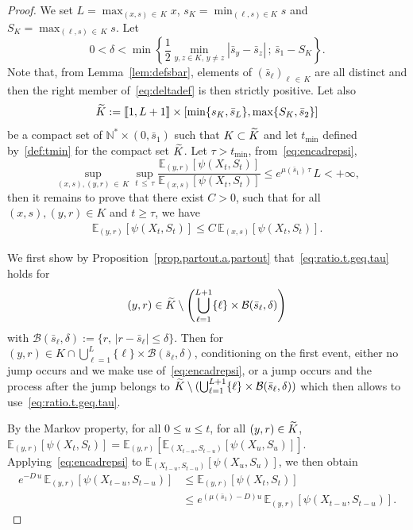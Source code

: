 \documentclass[AHL,Unicode,longabstracts,published]{cedram}
\newcommand{\llbracket}{\mathopen{[\mkern -2.7mu[}}
\newcommand{\rrbracket}{\mathclose{]\mkern -2.7mu]}}
\newcommand{\NN}{\mathbb{N}}
\newcommand{\EE}{\mathbb{E}}
\newcommand{\clB}{\mathcal{B}}
\newcommand{\SminK}{s_K}
\newcommand{\SmaxK}{S_K}
\newcommand{\barmu}{\mu(\bar s_1)}
\newcommand{\1}{\mathbf{1}}
\let\oldtilde\tilde
\renewcommand*{\tilde}[1]{\mathchoice{\widetilde{#1}}{\widetilde{#1}}{\oldtilde{#1}}{\oldtilde{#1}}}
\begin{document}
\begin{proof}
We set $L=\max_{(x,s)\,\in\,K}x$, $\SminK=\min_{(\ell, s)\in K} s $ and $\SmaxK=\max_{(\ell, s)\,\in\,K} s $. Let
\begin{equation}\label{eq:deltadef}
0<\delta < \min\left\{\frac{1}{2} \min_{y,z \in K, \, y\neq z } |\bar s_y - \bar s_z|\, ; \, \bar s_1-\SmaxK\right\}.
\end{equation}
Note that, from Lemma~\ref{lem:defsbar}, elements of $(\bar s_\ell)_{\ell \,\in\,K}$ are all distinct and then the right member of~\eqref{eq:deltadef} is then strictly positive. Let also 
\[
\tilde K := \llbracket 1, L+1 \rrbracket \times [\min\{s_K, \bar s_L\}, \max\{S_K, \bar s_2\}]
\]
be a compact set of $\NN^*\times (0,\bar s_1)$ such that $K\subset \tilde K$ and let $t_{\min}$ defined by~\eqref{def:tmin} for the compact set $\tilde K$. Let $\tau>t_{\min}$, from~\eqref{eq:encadrepsi},
\[
\sup_{(x,s),(y,r)\,\in\,K} \sup_{t\,\leq\,\tau} \frac{\EE_{(y,r)} \left[\psi (X_{t}, S_{t})\right]}{\EE_{(x,s)} \left[\psi (X_{t}, S_{t})\right]}
\leq e^{\mu(\bar s_1)\,\tau}\,L<+ \infty,
\]
then it remains to prove that there exist $C>0$, such that for all $(x,s),(y,r) \in K$ and $t\geq \tau$, we have
\begin{align}\label{eq:ratio.t.geq.tau}
\EE_{(y,r)} \left[\psi (X_{t}, S_{t})\right]\leq C\,\EE_{(x,s)} \left[\psi (X_{t}, S_{t})\right].
\end{align}

We first show by Proposition~\ref{prop.partout.a.partout} that~\eqref{eq:ratio.t.geq.tau} holds for
\[
(y,r)\in \tilde K \setminus \left(\bigcup_{\ell= 1}^{L+1} \{\ell\} \times \clB(\bar s_\ell, \delta)\right)
\]
with $\clB(\bar s_\ell, \delta):=\{r,\, |r-\bar s_\ell|\leq\delta\}$. Then for $(y,r) \in K \cap \bigcup_{\ell= 1}^L \{\ell\} \times \clB(\bar s_\ell, \delta)$, conditioning on the first event, either no jump occurs and we make use of~\eqref{eq:encadrepsi}, or a jump occurs and the process after the jump belongs to $\tilde K \setminus(\bigcup_{\ell= 1}^{L+1} \{\ell\} \times \clB(\bar s_\ell, \delta))$ which then allows to use~\eqref{eq:ratio.t.geq.tau}.


By the Markov property, for all $0\leq u\leq t$, for all $(y,r)\in \tilde K$, $\EE_{(y,r)}[\psi(X_t,S_t)] = \EE_{(y,r)}[\EE_{(X_{t-u},S_{t-u})}[\psi(X_u,S_u)]] $. Applying~\eqref{eq:encadrepsi} to $\EE_{(X_{t-u},S_{t-u})}[\psi(X_u,S_u)]$, we then obtain
\begin{equation}\label{eq:esppsi}
\begin{split}
e^{-D\,u}\,\EE_{(y,r)}\left[\psi(X_{t-u},S_{t-u})\right]
&\leq \EE_{(y,r)}\left[\psi(X_t,S_t)\right]
\\
&\leq e^{(\barmu-D)u}\,\EE_{(y,r)}\left[\psi(X_{t-u},S_{t-u})\right].
\end{split}
\end{equation}


\end{proof}
\end{document}
